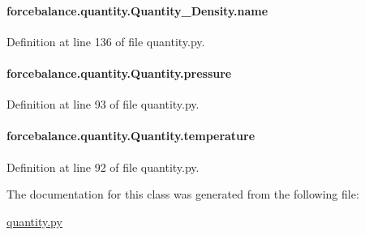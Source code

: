 \hypertarget{classforcebalance_1_1quantity_1_1Quantity__Density_afa773ce3a5a4034f6758898cc7d8c900}{
\paragraph[{name}]{\setlength{\rightskip}{0pt plus 5cm}forcebalance.\-quantity.\-Quantity\-\_\-\-Density.\-name}}\label{classforcebalance_1_1quantity_1_1Quantity__Density_afa773ce3a5a4034f6758898cc7d8c900}


Definition at line 136 of file quantity.\-py.

\hypertarget{classforcebalance_1_1quantity_1_1Quantity_a972fbe22434f2aedca70addaed1a0bea}{
\paragraph[{pressure}]{\setlength{\rightskip}{0pt plus 5cm}forcebalance.\-quantity.\-Quantity.\-pressure\hspace{0.3cm}{\ttfamily [inherited]}}}\label{classforcebalance_1_1quantity_1_1Quantity_a972fbe22434f2aedca70addaed1a0bea}


Definition at line 93 of file quantity.\-py.

\hypertarget{classforcebalance_1_1quantity_1_1Quantity_a30da0699f09b247b74014a9a1a6a2d09}{
\paragraph[{temperature}]{\setlength{\rightskip}{0pt plus 5cm}forcebalance.\-quantity.\-Quantity.\-temperature\hspace{0.3cm}{\ttfamily [inherited]}}}\label{classforcebalance_1_1quantity_1_1Quantity_a30da0699f09b247b74014a9a1a6a2d09}


Definition at line 92 of file quantity.\-py.



The documentation for this class was generated from the following file\-:\begin{DoxyCompactItemize}
\item 
\hyperlink{quantity_8py}{quantity.\-py}\end{DoxyCompactItemize}
